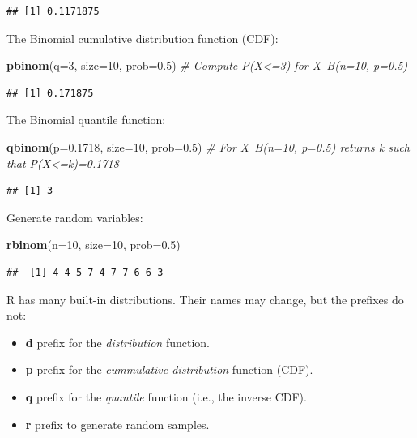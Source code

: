 \documentclass[]{book}
\newenvironment{Shaded}{\begin{snugshade}}{\end{snugshade}}
\newcommand{\KeywordTok}[1]{\textcolor[rgb]{0.13,0.29,0.53}{\textbf{#1}}}
\newcommand{\DataTypeTok}[1]{\textcolor[rgb]{0.13,0.29,0.53}{#1}}
\newcommand{\DecValTok}[1]{\textcolor[rgb]{0.00,0.00,0.81}{#1}}
\newcommand{\FloatTok}[1]{\textcolor[rgb]{0.00,0.00,0.81}{#1}}
\newcommand{\CommentTok}[1]{\textcolor[rgb]{0.56,0.35,0.01}{\textit{#1}}}
\newcommand{\NormalTok}[1]{#1}
\providecommand{\tightlist}{%
  \setlength{\itemsep}{0pt}\setlength{\parskip}{0pt}}
\theoremstyle{definition}
\theoremstyle{definition}
\theoremstyle{definition}
\theoremstyle{remark}
\begin{document}
\begin{verbatim}
## [1] 0.1171875
\end{verbatim}

The Binomial cumulative distribution function (CDF):

\begin{Shaded}
\begin{Highlighting}[]
\KeywordTok{pbinom}\NormalTok{(}\DataTypeTok{q=}\DecValTok{3}\NormalTok{, }\DataTypeTok{size=}\DecValTok{10}\NormalTok{, }\DataTypeTok{prob=}\FloatTok{0.5}\NormalTok{) }\CommentTok{# Compute P(X<=3) for X~B(n=10, p=0.5)   }
\end{Highlighting}
\end{Shaded}

\begin{verbatim}
## [1] 0.171875
\end{verbatim}

The Binomial quantile function:

\begin{Shaded}
\begin{Highlighting}[]
\KeywordTok{qbinom}\NormalTok{(}\DataTypeTok{p=}\FloatTok{0.1718}\NormalTok{, }\DataTypeTok{size=}\DecValTok{10}\NormalTok{, }\DataTypeTok{prob=}\FloatTok{0.5}\NormalTok{) }\CommentTok{# For X~B(n=10, p=0.5) returns k such that P(X<=k)=0.1718}
\end{Highlighting}
\end{Shaded}

\begin{verbatim}
## [1] 3
\end{verbatim}

Generate random variables:

\begin{Shaded}
\begin{Highlighting}[]
\KeywordTok{rbinom}\NormalTok{(}\DataTypeTok{n=}\DecValTok{10}\NormalTok{, }\DataTypeTok{size=}\DecValTok{10}\NormalTok{, }\DataTypeTok{prob=}\FloatTok{0.5}\NormalTok{)}
\end{Highlighting}
\end{Shaded}

\begin{verbatim}
##  [1] 4 4 5 7 4 7 7 6 6 3
\end{verbatim}

R has many built-in distributions. Their names may change, but the
prefixes do not:

\begin{itemize}
\tightlist
\item
  \textbf{d} prefix for the \emph{distribution} function.
\item
  \textbf{p} prefix for the \emph{cummulative distribution} function
  (CDF).
\item
  \textbf{q} prefix for the \emph{quantile} function (i.e., the inverse
  CDF).
\item
  \textbf{r} prefix to generate random samples.
\end{itemize}
\end{document}
